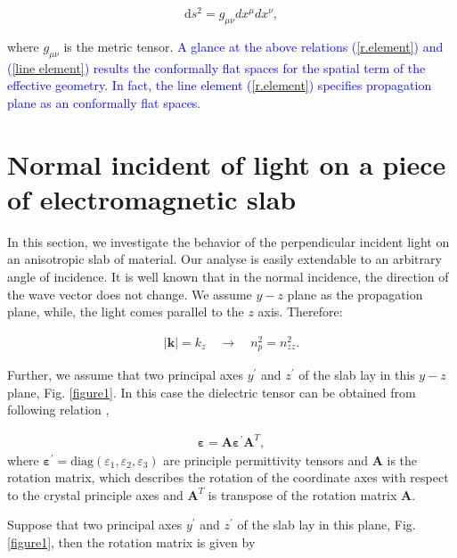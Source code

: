 \documentclass[9pt,twocolumn,twoside]{osajnl}
\begin{document}
\begin{equation}\label{line element}
\mathrm{d}s^{2}=g_{\mu\nu}dx^{\mu}dx^{\nu},
\end{equation}

where $ g_{\mu\nu} $ is the metric tensor. \textcolor{blue}{A glance at the above relations (\ref{r.element}) and (\ref{line element}) results the conformally flat spaces for the spatial term of the effective geometry.  In fact, the line element (\ref{r.element}) specifies propagation plane as an conformally flat spaces. }

\section{Normal incident of light on a piece of electromagnetic slab} \label{general-normal}

In this section, we investigate the behavior of the perpendicular incident light on an anisotropic slab of material.
Our analyse is easily extendable to an arbitrary angle of incidence.
It is well known that in the normal incidence, the direction of the wave vector does not change.  We assume $y-z$ plane as the propagation plane, while, the light comes parallel to the $z$ axis. Therefore:  

\begin{eqnarray}\label{pt}
|\mathbf{k}|=k_{z} \quad\rightarrow \quad {n}^{2}_{p}=n^{2}_{zz}.
\end{eqnarray} 

Further, we assume that  two principal axes  $y^{\prime}$ and $z^{\prime}$ of the slab lay in this $y-z$ plane, Fig. \ref{figure1}.
In this case the dielectric tensor can be obtained from following relation \cite{yeh1980optics},

 \begin{eqnarray}\label{t.t}
		\boldsymbol{\varepsilon}= \mathbf{A} \boldsymbol{\varepsilon^{\prime}}\mathbf{A}^{T},
\end{eqnarray}
where $ \boldsymbol{\varepsilon^{\prime}} = \mbox{diag} (\varepsilon_{1},\varepsilon_{2},\varepsilon_{3})$ are  principle permittivity tensors and $\mathbf{A}$  is the rotation matrix, which describes the rotation of the coordinate axes with respect to the crystal principle axes and $ \mathbf{A}^{T}$ is transpose of the rotation matrix $ \mathbf{A}$.

Suppose that two principal axes  $y^{\prime}$ and $z^{\prime}$ of the slab lay in this plane, Fig. \ref{figure1}, then the rotation matrix is given by
 
\end{document}
